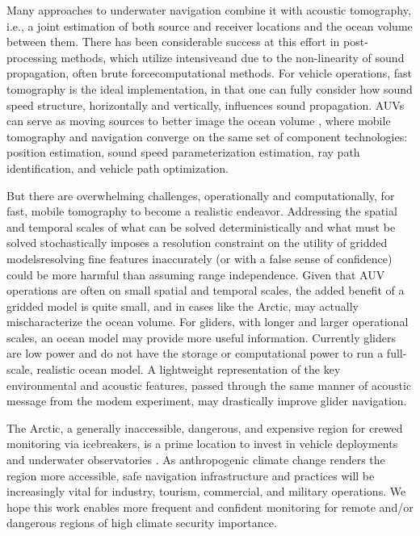  Many approaches to underwater navigation combine it with acoustic tomography, i.e., a joint estimation of both source and receiver locations and the ocean volume between them.
There has been considerable success at this effort in post-processing methods, which utilize intensive\textemdash and due to the non-linearity of sound propagation, often brute force\textemdash computational methods. 
For vehicle operations, fast tomography is the ideal implementation, in that one can fully consider how sound speed structure, horizontally and vertically, influences sound propagation.
AUVs can serve as moving sources to better image the ocean volume \citep{deffenbaugh_optimal_1997,elisseeff_ocean_2002}, where mobile tomography and navigation converge on the same set of component technologies: position estimation, sound speed parameterization estimation, ray path identification, and vehicle path optimization.

But there are overwhelming challenges, operationally and computationally, for fast, mobile tomography to become a realistic endeavor.
Addressing the spatial and temporal scales of what can be solved deterministically and what must be solved stochastically imposes a resolution constraint on the utility of gridded models\textemdash resolving fine features inaccurately (or with a false sense of confidence) could be more harmful than assuming range independence.
Given that AUV operations are often on small spatial and temporal scales, the added benefit of a gridded model is quite small, and in cases like the Arctic, may actually mischaracterize the ocean volume. 
For gliders, with longer and larger operational scales, an ocean model may provide more useful information.
Currently gliders are low power and do not have the storage or computational power to run a full-scale, realistic ocean model.
A lightweight representation of the key environmental and acoustic features, passed through the same manner of acoustic message from the modem experiment, may drastically improve glider navigation.

The Arctic, a generally inaccessible, dangerous, and expensive region for crewed monitoring via icebreakers,  is a prime location to invest in vehicle deployments and underwater observatories \citep{mikhalevsky_multipurpose_2015}.
As anthropogenic climate change renders the region more accessible, safe navigation infrastructure and practices will be increasingly vital for industry, tourism, commercial, and military operations.
We hope this work enables more frequent and confident monitoring for remote and/or dangerous regions of high climate security importance.

